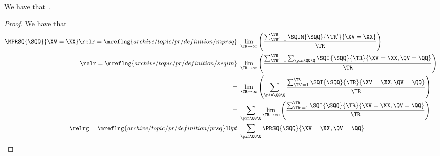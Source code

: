 \begin{proposition}
  We have that\ \mprsqexprprop.%
\end{proposition}

\begin{proof}
  We have that
  \begin{align*}
  \MPRSQ{\SQQ}{\XV = \XX}
                    \relr = {\mreflng{archive/topic/pr/definition/mprsq}} \ & 
                    \lim_{\TR \rightarrow \infty}\left(\frac{\sum_{\TR' = 1}^{\TR}\SQIM{\SQQ}{\TR'}{\XV = \XX}}{\TR}\right)\\
                    \relr = {\mreflng{archive/topic/pr/definition/seqim}} \ & 
                    \lim_{\TR \rightarrow \infty}\left(\frac{\sum_{\TR' = 1}^{\TR}\sum_{\pin\QQ\Q} \SQI{\SQQ}{\TR}{\XV = \XX, \QV = \QQ}}{\TR}\right)\\
                    = \ & 
                    \lim_{\TR \rightarrow \infty}\left(\sum_{\pin\QQ\Q} \frac{\sum_{\TR' = 1}^{\TR}\SQI{\SQQ}{\TR}{\XV = \XX, \QV = \QQ}}{\TR}\right)\\
                    = \ & 
                    \sum_{\pin\QQ\Q} \lim_{\TR \rightarrow \infty}\left(\frac{\sum_{\TR' = 1}^{\TR}\SQI{\SQQ}{\TR}{\XV = \XX, \QV = \QQ}}{\TR}\right)\\
                    \relrg = {\mreflng{archive/topic/pr/definition/prsq}} 10pt \ & 
                    \sum_{\pin\QQ\Q}\PRSQ{\SQQ}{\XV = \XX, \QV = \QQ}
  \end{align*}
\end{proof}
